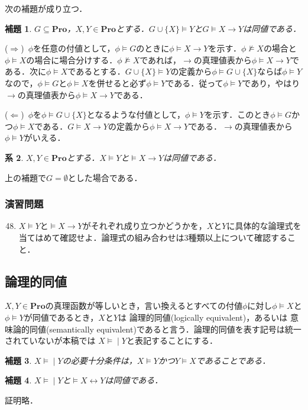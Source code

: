 \documentclass{ltjsarticle}
\makeatletter
\theoremstyle{mystyle1}
\theoremstyle{mystyle3}
\newtheorem{cor}{系}
\newtheorem{lem}[cor]{補題}
\theoremstyle{mystyle2}
\renewenvironment{proof}[1][\proofname]{\par
  \pushQED{\qed}%
  \normalfont
  \topsep6\p@\@plus6\p@ \trivlist
  \item[\hskip\labelsep{\bfseries\sffamily #1}]\ignorespaces
}{%
  \popQED\endtrivlist\@endpefalse
}
\renewcommand\proofname{\ensuremath{\because}}
\newcommand{\bPro}{\ensuremath{\mathbf{Pro}}}
\newcommand{\lequiv}{\ensuremath{\models\!\mid}}
\newcommand{\red}[1]{{\color{red} #1}}
\makeatother
\begin{document}
次の補題が成り立つ．
\begin{lem}
  $G\subseteq\bPro$，$X,Y\in\bPro$とする．$G\cup\{X\}\models Y$と$G\models X\to Y$は同値である．
\end{lem}
\begin{proof}
  ($\Rightarrow$)\ $\phi$を任意の付値として，$\phi\models G$のときに$\phi\models X\to Y$を示す．$\phi\not\models X$の場合と$\phi\models X$の場合に場合分けする．$\phi\not\models X$であれば，$\to$の真理値表から$\phi\models X\to Y$である．次に$\phi\models X$であるとする．$G\cup\{X\}\models Y$の定義から$\phi\models G\cup\{X\}$ならば$\phi\models Y$なので，$\phi\models G$と$\phi\models X$を併せると必ず$\phi\models Y$である．従って$\phi\models Y$であり，やはり$\to$の真理値表から$\phi\models X\to Y$である．

  ($\Leftarrow$)\ $\phi$を$\phi\models G\cup\{X\}$となるような付値として，$\phi\models Y$を示す．このとき$\phi\models G$かつ$\phi\models X$である．$G\models X\to Y$の定義から$\phi\models X\to Y$である．$\to$の真理値表から$\phi\models Y$がいえる．
\end{proof}
\begin{cor}
  $X,Y\in\bPro$とする．$X\models Y$と$\models X\to Y$は同値である．
\end{cor}
\begin{proof}
  上の補題で$G = \emptyset$とした場合である．
\end{proof}
\subsubsection*{演習問題}
\begin{enumerate}
  \setcounter{enumi}{47}
  \item $X\models Y$と$\models X\to Y$がそれぞれ成り立つかどうかを，$X$と$Y$に具体的な論理式を当てはめて確認せよ．論理式の組み合わせは3種類以上について確認すること．
\end{enumerate}
\subsection{論理的同値}
$X,Y\in\bPro$の真理函数が等しいとき，言い換えるとすべての付値$\phi$に対し$\phi\models X$と$\phi\models Y$が同値であるとき，$X$と$Y$は\red{論理的同値}(logically equivalent)，あるいは\red{意味論的同値}(semantically equivalent)であると言う．論理的同値を表す記号は統一されていないが本稿では\red{$X\lequiv Y$}と表記することにする．
\begin{lem}
  $X\lequiv Y$の必要十分条件は，$X\models Y$かつ$Y\models X$であることである．
\end{lem}
\begin{lem}
  $X\lequiv Y$と$\models X\leftrightarrow Y$は同値である．
\end{lem}
証明略．
\end{document}
